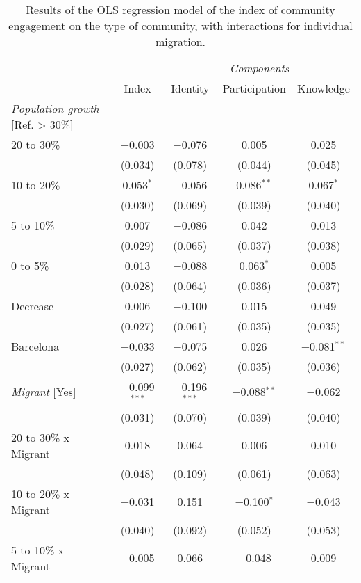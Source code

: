 \documentclass[12pt,a4paper]{article}
\begin{document}
\begin{scriptsize}
\begin{longtable}{lcccc}
\caption{Results of the OLS regression model of the index of community
engagement on the type of community, with interactions for individual
migration.}\label{tab:mod_hyp2}\tabularnewline

\toprule
 & &  \multicolumn{3}{c}{\it Components} \tabularnewline
\cline{3-5} 
 & Index & Identity & Participation & Knowledge \tabularnewline
\midrule 
{\it Population growth} [Ref. > 30\%]\\
 20 to 30\%  & $-$0.003 & $-$0.076 & 0.005 & 0.025 \\ 
  & (0.034) & (0.078) & (0.044) & (0.045) \\ 
 10 to 20\% &  0.053$^{*}$ & $-$0.056 & 0.086$^{**}$ & 0.067$^{*}$ \\ 
   & (0.030) & (0.069) & (0.039) & (0.040) \\ 
 5 to 10\%  & 0.007 & $-$0.086 & 0.042 & 0.013 \\ 
   & (0.029) & (0.065) & (0.037) & (0.038) \\ 
 0 to 5\%  & 0.013 & $-$0.088 & 0.063$^{*}$ & 0.005 \\ 
   & (0.028) & (0.064) & (0.036) & (0.037) \\ 
 Decrease  & 0.006 & $-$0.100 & 0.015 & 0.049 \\ 
   & (0.027) & (0.061) & (0.035) & (0.035) \\ 
 Barcelona  & $-$0.033 & $-$0.075 & 0.026 & $-$0.081$^{**}$ \\ 
   & (0.027) & (0.062) & (0.035) & (0.036) \\ 
 {\it Migrant} [Yes]  & $-$0.099$^{***}$ & $-$0.196$^{***}$ & $-$0.088$^{**}$ & $-$0.062 \\ 
 & (0.031) & (0.070) & (0.039) & (0.040) \\ 
20 to 30\% x Migrant  & 0.018 & 0.064 & 0.006 & 0.010 \\ 
   & (0.048) & (0.109) & (0.061) & (0.063) \\ 
10 to 20\% x Migrant & $-$0.031 & 0.151 & $-$0.100$^{*}$ & $-$0.043 \\ 
   & (0.040) & (0.092) & (0.052) & (0.053) \\ 
5 to 10\% x Migrant  & $-$0.005 & 0.066 & $-$0.048 & 0.009 \\ 

\end{longtable}
\end{scriptsize}
\end{document}
